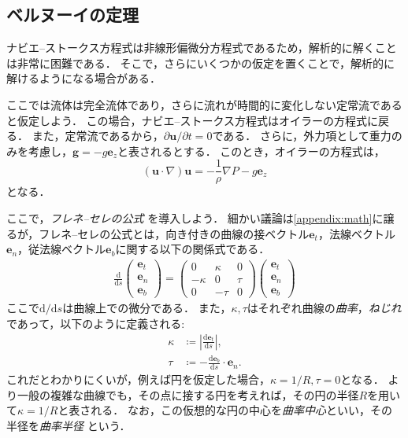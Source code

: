 \documentclass[uplatex,dvipdfmx,a4j,11pt]{jsreport}
\newcommand{\e}{\mathbf{e}} %
\newcommand{\diff}{\mathrm{d}} %
\numberwithin{equation}{chapter}
\begin{document}
\subsection{ベルヌーイの定理}
ナビエ--ストークス方程式は非線形偏微分方程式であるため，解析的に解くことは非常に困難である．
そこで，さらにいくつかの仮定を置くことで，解析的に解けるようになる場合がある．

ここでは流体は完全流体であり，さらに流れが時間的に変化しない定常流であると仮定しよう．
この場合，ナビエ--ストークス方程式はオイラーの方程式に戻る．
また，定常流であるから，$\partial \mathbf{u}/\partial t = 0$である．
さらに，外力項として重力のみを考慮し，$\mathbf{g} = -g \e_z$と表されるとする．
このとき，オイラーの方程式は， 
\begin{equation*}
  (\mathbf{u}\cdot \nabla)\mathbf{u} = -\frac{1}{\rho} \nabla P - g \e_z
\end{equation*}
となる．

ここで，\emph{フレネ--セレの公式} を導入しよう．
細かい議論は\cref{appendix:math}に譲るが，フレネ--セレの公式とは，向き付きの曲線の接ベクトル$\e_t$，法線ベクトル$\e_n$，従法線ベクトル$\e_b$に関する以下の関係式である．
\begin{align*}
  \frac{\diff }{\diff s}
  \begin{pmatrix}
    \e_t \\
    \e_n \\
    \e_b
  \end{pmatrix}
  =
  \begin{pmatrix}
    0 & \kappa & 0\\
    -\kappa & 0 & \tau\\
    0 & -\tau & 0
  \end{pmatrix}
  \begin{pmatrix}
    \e_t \\
    \e_n \\
    \e_b
  \end{pmatrix}
\end{align*}
ここで$\diff/\diff s$は曲線上での微分である．
また，$\kappa, \tau$はそれぞれ曲線の\emph{曲率}，\emph{ねじれ}であって，以下のように定義される:
\begin{align*}
  \kappa &\coloneqq \left|\frac{\diff \e_t}{\diff s}\right|,\\
  \tau &\coloneqq -\frac{\diff \e_b}{\diff s} \cdot \e_n.
\end{align*}
これだとわかりにくいが，例えば円を仮定した場合，$\kappa = 1/R, \tau = 0$となる．
より一般の複雑な曲線でも，その点に接する円を考えれば，その円の半径$R$を用いて$\kappa = 1/R$と表される．
なお，この仮想的な円の中心を\emph{曲率中心}といい，その半径を\emph{曲率半径} という．
\end{document}
